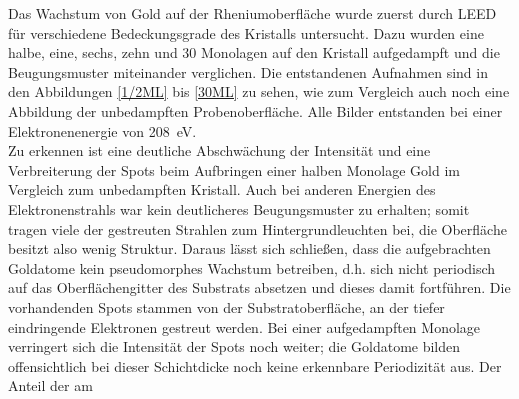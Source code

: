 Das Wachstum von Gold auf der Rheniumoberfläche wurde zuerst durch LEED für
verschiedene Bedeckungsgrade des Kristalls untersucht. Dazu wurden eine halbe, eine, sechs, zehn und
30 Monolagen auf den Kristall aufgedampft und die Beugungsmuster miteinander verglichen. Die
entstandenen Aufnahmen sind in den Abbildungen \ref{1/2ML} bis \ref{30ML} zu sehen, wie zum
Vergleich auch noch eine Abbildung der unbedampften Probenoberfläche. Alle Bilder entstanden
bei einer Elektronenenergie von \SI{208}{eV}.
\\
Zu erkennen ist eine deutliche Abschwächung der Intensität und eine Verbreiterung der Spots beim
Aufbringen einer halben Monolage Gold im Vergleich zum unbedampften Kristall. Auch bei anderen Energien des
Elektronenstrahls war kein deutlicheres Beugungsmuster zu erhalten; somit tragen viele der
gestreuten Strahlen zum Hintergrundleuchten bei, die Oberfläche besitzt also wenig Struktur.
Daraus lässt sich schließen, dass die aufgebrachten Goldatome kein pseudomorphes Wachstum betreiben, d.h.
sich nicht periodisch auf das Oberflächengitter des Substrats absetzen und dieses damit fortführen.
Die vorhandenden Spots stammen von der Substratoberfläche, an der tiefer eindringende Elektronen
gestreut werden. Bei einer aufgedampften Monolage verringert sich die Intensität der Spots noch
weiter; die Goldatome bilden offensichtlich bei dieser Schichtdicke noch keine erkennbare
Periodizität aus. Der Anteil der am

